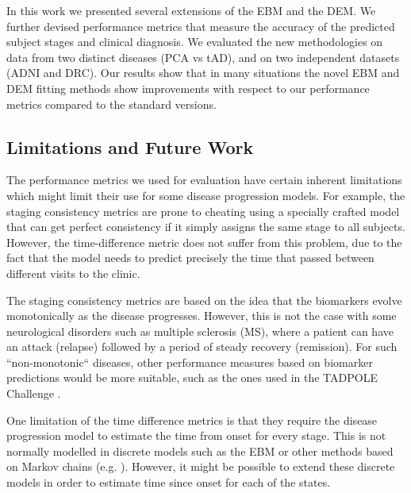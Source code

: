 In this work we presented several extensions of the EBM and the DEM. We further devised performance metrics that measure the accuracy of the predicted subject stages and clinical diagnosis. We evaluated the new methodologies on data from two distinct diseases (PCA vs tAD), and on two independent datasets (ADNI and DRC). Our results show that in many situations the novel EBM and DEM fitting methods show improvements with respect to our performance metrics compared to the standard versions. 

\subsection{Limitations and Future Work}
\label{sec:perfSumLim}

The performance metrics we used for evaluation have certain inherent limitations which might limit their use for some disease progression models. For example, the staging consistency metrics are prone to cheating using a specially crafted model that can get perfect consistency if it simply assigns the same stage to all subjects. However, the time-difference metric does not suffer from this problem, due to the fact that the model needs to predict precisely the time that passed between different visits to the clinic. 

The staging consistency metrics are based on the idea that the biomarkers evolve monotonically as the disease progresses. However, this is not the case with some neurological disorders such as multiple sclerosis (MS), where a patient can have an attack (relapse) followed by a period of steady recovery (remission). For such ``non-monotonic`` diseases, other performance measures based on biomarker predictions would be more suitable, such as the ones used in the TADPOLE Challenge \cite{marinescu2018tadpole}. 

One limitation of the time difference metrics is that they require the disease progression model to estimate the time from onset for every stage. This is not normally modelled in discrete models such as the EBM or other methods based on Markov chains (e.g. \cite{sukkar2012disease}). However, it might be possible to extend these discrete models in order to estimate time since onset for each of the states.

